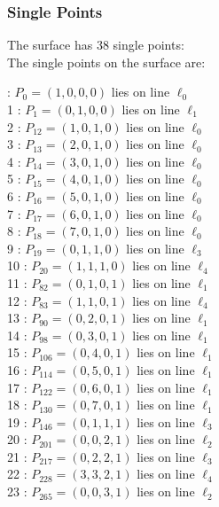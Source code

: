 \documentclass{article}
\begin{document}
{\subsubsection*{Single Points}
The surface has 38 single points:\\
The single points on the surface are:\\
\begin{multicols}{2}
 : $P_{0}=( 1, 0, 0, 0 )$ lies on line $\ell_{0}$\\
1 : $P_{1}=( 0, 1, 0, 0 )$ lies on line $\ell_{1}$\\
2 : $P_{12}=( 1, 0, 1, 0 )$ lies on line $\ell_{0}$\\
3 : $P_{13}=( 2, 0, 1, 0 )$ lies on line $\ell_{0}$\\
4 : $P_{14}=( 3, 0, 1, 0 )$ lies on line $\ell_{0}$\\
5 : $P_{15}=( 4, 0, 1, 0 )$ lies on line $\ell_{0}$\\
6 : $P_{16}=( 5, 0, 1, 0 )$ lies on line $\ell_{0}$\\
7 : $P_{17}=( 6, 0, 1, 0 )$ lies on line $\ell_{0}$\\
8 : $P_{18}=( 7, 0, 1, 0 )$ lies on line $\ell_{0}$\\
9 : $P_{19}=( 0, 1, 1, 0 )$ lies on line $\ell_{3}$\\
10 : $P_{20}=( 1, 1, 1, 0 )$ lies on line $\ell_{4}$\\
11 : $P_{82}=( 0, 1, 0, 1 )$ lies on line $\ell_{1}$\\
12 : $P_{83}=( 1, 1, 0, 1 )$ lies on line $\ell_{4}$\\
13 : $P_{90}=( 0, 2, 0, 1 )$ lies on line $\ell_{1}$\\
14 : $P_{98}=( 0, 3, 0, 1 )$ lies on line $\ell_{1}$\\
15 : $P_{106}=( 0, 4, 0, 1 )$ lies on line $\ell_{1}$\\
16 : $P_{114}=( 0, 5, 0, 1 )$ lies on line $\ell_{1}$\\
17 : $P_{122}=( 0, 6, 0, 1 )$ lies on line $\ell_{1}$\\
18 : $P_{130}=( 0, 7, 0, 1 )$ lies on line $\ell_{1}$\\
19 : $P_{146}=( 0, 1, 1, 1 )$ lies on line $\ell_{3}$\\
20 : $P_{201}=( 0, 0, 2, 1 )$ lies on line $\ell_{2}$\\
21 : $P_{217}=( 0, 2, 2, 1 )$ lies on line $\ell_{3}$\\
22 : $P_{228}=( 3, 3, 2, 1 )$ lies on line $\ell_{4}$\\
23 : $P_{265}=( 0, 0, 3, 1 )$ lies on line $\ell_{2}$\\

\end{multicols}}
\end{document}
